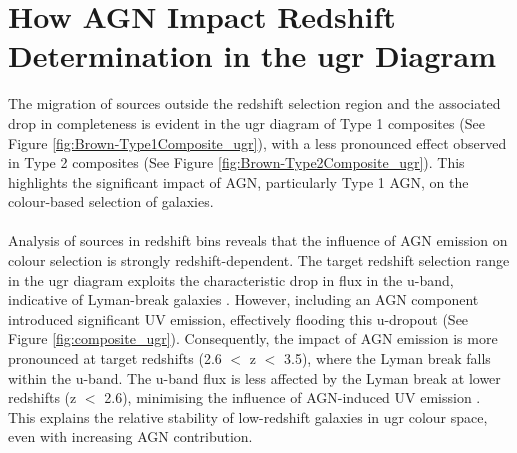 \section{How AGN Impact Redshift Determination in the ugr Diagram}
The migration of sources outside the redshift selection region and the associated drop in completeness is evident in the ugr diagram of Type 1 composites (See Figure \ref{fig:Brown-Type1Composite_ugr}), with a less pronounced effect observed in Type 2 composites (See Figure \ref{fig:Brown-Type2Composite_ugr}). This highlights the significant impact of AGN, particularly Type 1 AGN, on the colour-based selection of galaxies.\\\\
Analysis of sources in redshift bins reveals that the influence of AGN emission on colour selection is strongly redshift-dependent. The target redshift selection range in the ugr diagram exploits the characteristic drop in flux in the u-band, indicative of Lyman-break galaxies \citep{giavalisco_lyman-break_2002}. However, including an AGN component introduced significant UV emission, effectively flooding this u-dropout (See Figure \ref{fig:composite_ugr}). Consequently, the impact of AGN emission is more pronounced at target redshifts (2.6 $<$ z $<$ 3.5), where the Lyman break falls within the u-band. The u-band flux is less affected by the Lyman break at lower redshifts (z $<$ 2.6), minimising the influence of AGN-induced UV emission \citep{madau_high-redshift_1996}. This explains the relative stability of low-redshift galaxies in ugr colour space, even with increasing AGN contribution.\\\\
